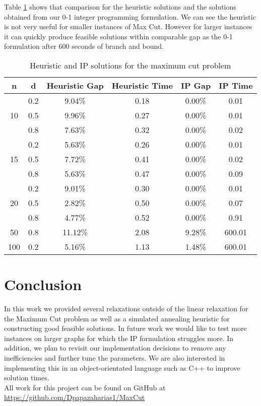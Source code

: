 \documentclass[12pt]{article}
\theoremstyle{plain}
\theoremstyle{definition}
\begin{document}
Table \ref{tab:LB} shows that comparison for the heuristic solutions and the solutions obtained from our 0-1 integer programming formulation. We can see the heuristic is not very useful for smaller instances of Max Cut. However for larger instances it can quickly produce feasible solutions within comparable gap as the 0-1 formulation after 600 seconds of branch and bound.

\begin{table}[h]
	\small
	\centering
	\begin{tabular}{cc|cc|cc}
		\hline
		n                   & d   & Heuristic Gap & Heuristic Time & IP Gap & IP Time \\ \hline
		\multirow{3}{*}{10} & 0.2 & 9.04\%        & 0.18           & 0.00\% & 0.01    \\
		& 0.5 & 9.96\%        & 0.27           & 0.00\% & 0.01    \\
		& 0.8 & 7.63\%        & 0.32           & 0.00\% & 0.02    \\ \hline
		\multirow{3}{*}{15} & 0.2 & 5.63\%        & 0.26           & 0.00\% & 0.01    \\
		& 0.5 & 7.72\%        & 0.41           & 0.00\% & 0.02    \\
		& 0.8 & 5.63\%        & 0.47           & 0.00\% & 0.09    \\ \hline
		\multirow{3}{*}{20} & 0.2 & 9.01\%        & 0.30           & 0.00\% & 0.01    \\
		& 0.5 & 2.82\%        & 0.50           & 0.00\% & 0.07    \\
		& 0.8 & 4.77\%        & 0.52           & 0.00\% & 0.91    \\ \hline
		50                  & 0.8 & 11.12\%       & 2.08           & 9.28\% & 600.01  \\ \hline
		100                 & 0.2 & 5.16\%        & 1.13           & 1.48\% & 600.01  \\ \hline
	\end{tabular}
	\caption{Heuristic and IP solutions for the maximum cut problem}
	\label{tab:LB}
\end{table}

\section{Conclusion}

In this work we provided several relaxations outside of the linear relaxation for the Maximum Cut problem as well as a simulated annealing heuristic for constructing good feasible solutions. In future work we would like to test more instances on larger graphs for which the IP formulation struggles more. In addition, we plan to revisit our implementation decisions to remove any inefficiencies and further tune the parameters. We are also interested in implementing this in an object-orientated language such as C++ to improve solution times.\\ 

\noindent All work for this project can be found on GitHub at \url{https://github.com/Dpapazaharias1/MaxCut}
\end{document}
